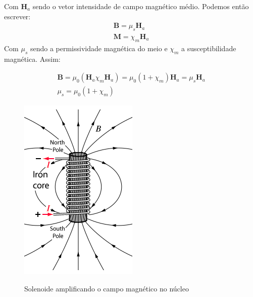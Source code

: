 \documentclass[
        12pt,                           %
        openright,                      %
        twoside,                        %
        a4paper,                        %
        english,                        %
        french,                         %
        spanish,                        %
        brazil                          %
        ]{abntex2}
\begin{document}
Com $\bm{H}_a$ sendo o vetor intensidade de campo magnético médio. Podemos então
escrever:
\begin{gather}
  \bm{B} = \mu_s \bm{H}_a \\
  \bm{M} = \chi_m \bm{H}_a
\end{gather}
Com $\mu_s$ sendo a permissividade magnética do meio e $\chi_m$ a susceptibilidade
magnética. Assim:

\begin{gather}
  \bm{B} = \mu_0 (\bm{H}_a \chi_m \bm{H}_a) = \mu_0(1 + \chi_m) \bm{H}_a = \mu_s \bm{H}_a\\
  \mu_s = \mu_0 (1 + \chi_m)
\end{gather}

\begin{figure}[!htp]
  \centering
  \includegraphics[width=0.2\columnwidth]{Elecmagnet.png}
  \label{fig:chap:embasamento:6}
  \caption{Solenoide amplificando o campo magnético no núcleo}
\end{figure}


\end{document}
